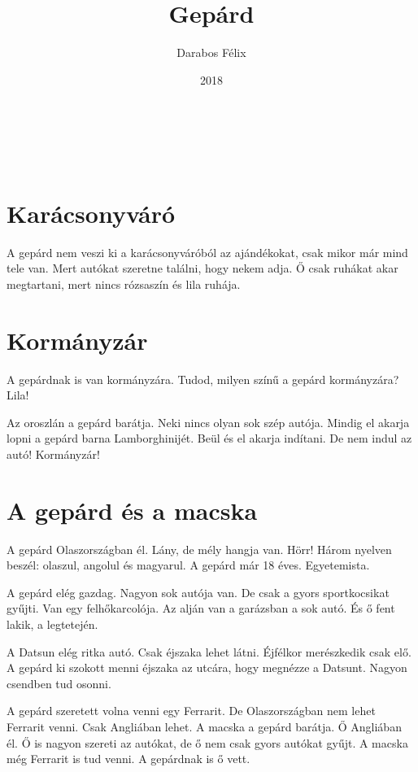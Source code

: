 \documentclass[12pt]{memoir}
\author{Darabos Félix}
\date{2018}
\title{Gepárd}
\begin{document}
\begin{titlingpage}
  \centering
  \vspace*{0.2\textheight}
  {\fontsize{80pt}{96pt}\playfair \thetitle}\\[\baselineskip]
  {\large\theauthor}\\[\baselineskip]
  \vfill
  {\thedate}
  \vspace*{0.1\textheight}
\end{titlingpage}

\pagestyle{plain}


\section{Karácsonyváró}
A gepárd nem veszi ki a karácsonyváróból az ajándékokat, csak mikor már mind
tele van. Mert autókat szeretne találni, hogy nekem adja. Ő csak ruhákat akar
megtartani, mert nincs rózsaszín és lila ruhája.


\section{Kormányzár}
A gepárdnak is van kormányzára. Tudod, milyen színű a gepárd kormányzára? Lila!

Az oroszlán a gepárd barátja. Neki nincs olyan sok szép autója. Mindig el
akarja lopni a gepárd barna Lamborghinijét. Beül és el akarja indítani. De nem
indul az autó! Kormányzár!


\section{A gepárd és a macska}
A gepárd Olaszországban él. Lány, de mély hangja van. Hörr! Három nyelven
beszél: olaszul, angolul és magyarul. A gepárd már 18 éves. Egyetemista.

A gepárd elég gazdag. Nagyon sok autója van. De csak a gyors sportkocsikat
gyűjti. Van egy felhőkarcolója. Az alján van a garázsban a sok autó. És ő fent
lakik, a legtetején.

A Datsun elég ritka autó. Csak éjszaka lehet látni. Éjfélkor merészkedik csak
elő. A gepárd ki szokott menni éjszaka az utcára, hogy megnézze a Datsunt.
Nagyon csendben tud osonni.

A gepárd szeretett volna venni egy Ferrarit. De Olaszországban nem lehet
Ferrarit venni. Csak Angliában lehet. A macska a gepárd barátja. Ő Angliában
él. Ő is nagyon szereti az autókat, de ő nem csak gyors autókat gyűjt. A macska
még Ferrarit is tud venni. A gepárdnak is ő vett.
\end{document}
